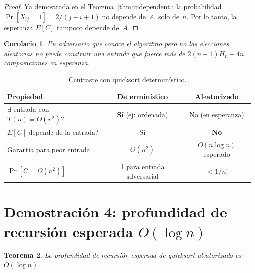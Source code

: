 \documentclass[11pt, letterpaper]{article}
\theoremstyle{definition}
\theoremstyle{plain}
\newtheorem{theorem}{Teorema}[section]
\newtheorem{corollary}[theorem]{Corolario}
\theoremstyle{remark}
\begin{document}
\begin{proof}
Ya demostrada en el Teorema~\ref{thm:independent}: la probabilidad
$\Pr[X_{ij} = 1] = 2/(j{-}i{+}1)$ no depende de~$A$, solo de~$n$.
Por lo tanto, la esperanza $E[C]$ tampoco depende de~$A$.
\end{proof}

\begin{corollary}
Un adversario que conoce el algoritmo pero no las elecciones aleatorias
no puede construir una entrada que fuerce más de $2(n{+}1)H_n - 4n$
comparaciones en esperanza.
\end{corollary}

\begin{table}[h]
\centering
\caption{Contraste con quicksort determinístico.}
\begin{tabular}{lcc}
\toprule
\textbf{Propiedad}
  & \textbf{Determinístico}
  & \textbf{Aleatorizado} \\
\midrule
$\exists$ entrada con $T(n) = \Theta(n^2)$?
  & \textbf{Sí} (ej: ordenada)
  & No (en esperanza) \\
$E[C]$ depende de la entrada?
  & Sí
  & \textbf{No} \\
Garantía para peor entrada
  & $\Theta(n^2)$
  & $O(n\log n)$ esperado \\
$\Pr[C = \Omega(n^2)]$
  & 1 para entrada adversarial
  & $< 1/n!$ \\
\bottomrule
\end{tabular}
\end{table}

\section{Demostración 4: profundidad de recursión esperada
  \texorpdfstring{$O(\log n)$}{O(log n)}}

\begin{theorem}\label{thm:depth}
La profundidad de recursión esperada de quicksort aleatorizado es
$O(\log n)$.
\end{theorem}
\end{document}
